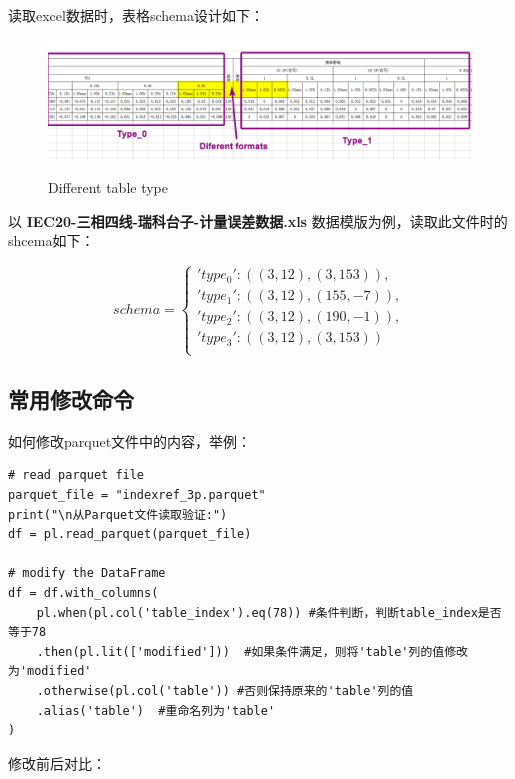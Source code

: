 读取excel数据时，表格schema设计如下：
\begin{figure}[H]
    \begin{center}
        \includegraphics[width=.95\linewidth]{res/excel_type.png}\\
        \caption{Different table type }\label{excel_type}
    \end{center}
\end{figure}

以 \textbf{IEC20-三相四线-瑞科台子-计量误差数据.xls} 数据模版为例，读取此文件时的shcema如下：

\[ 
schema= \left\{
\begin{array}{ll}
    'type_0': ((3, 12), (3, 153)),\\
    'type_1': ((3, 12), (155, -7)),\\
    'type_2': ((3, 12), (190, -1)),\\
    'type_3': ((3, 12), (3, 153))\\
\end{array} 
\right. 
\]

\subsection{常用修改命令}

如何修改parquet文件中的内容，举例：

\begin{verbatim}
# read parquet file
parquet_file = "indexref_3p.parquet"
print("\n从Parquet文件读取验证:")
df = pl.read_parquet(parquet_file)

# modify the DataFrame
df = df.with_columns(
    pl.when(pl.col('table_index').eq(78)) #条件判断，判断table_index是否等于78
    .then(pl.lit(['modified']))  #如果条件满足，则将'table'列的值修改为'modified'
    .otherwise(pl.col('table')) #否则保持原来的'table'列的值
    .alias('table')  #重命名列为'table'
)
\end{verbatim}

修改前后对比：


